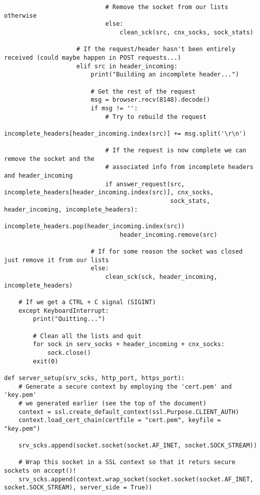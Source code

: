 \documentclass[landscape]{article}
\begin{document}
\begin{verbatim}
                            # Remove the socket from our lists otherwise
                            else:
                                clean_sck(src, cnx_socks, sock_stats)

                    # If the request/header hasn't been entirely received (could maybe happen in POST requests...)
                    elif src in header_incoming:
                        print("Building an incomplete header...")

                        # Get the rest of the request
                        msg = browser.recv(8148).decode()
                        if msg != '':
                            # Try to rebuild the request
                            incomplete_headers[header_incoming.index(src)] += msg.split('\r\n')

                            # If the request is now complete we can remove the socket and the
                            # associated info from incomplete headers and header_incoming
                            if answer_request(src, incomplete_headers[header_incoming.index(src)], cnx_socks,
                                              sock_stats, header_incoming, incomplete_headers):
                                incomplete_headers.pop(header_incoming.index(src))
                                header_incoming.remove(src)

                        # If for some reason the socket was closed just remove it from our lists
                        else:
                            clean_sck(sck, header_incoming, incomplete_headers)

    # If we get a CTRL + C signal (SIGINT)
    except KeyboardInterrupt:
        print("Quitting...")

        # Clean all the lists and quit
        for sock in serv_socks + header_incoming + cnx_socks:
            sock.close()
        exit(0)

def server_setup(srv_scks, http_port, https_port):
    # Generate a secure context by employing the 'cert.pem' and 'key.pem'
    # we generated earlier (see the top of the document)
    context = ssl.create_default_context(ssl.Purpose.CLIENT_AUTH)
    context.load_cert_chain(certfile = "cert.pem", keyfile = "key.pem")

    srv_scks.append(socket.socket(socket.AF_INET, socket.SOCK_STREAM))

    # Wrap this socket in a SSL context so that it returs secure sockets on accept()!
    srv_scks.append(context.wrap_socket(socket.socket(socket.AF_INET, socket.SOCK_STREAM), server_side = True))


\end{verbatim}
\end{document}
